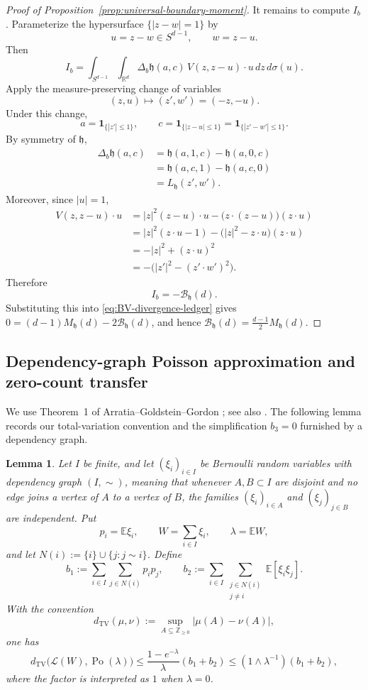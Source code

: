 \documentclass[11pt]{article}
\newtheorem{lemma}[theorem]{Lemma}
\theoremstyle{remark}
\newcommand{\ind}{\mathbf 1}
\newcommand{\E}{\mathbb E}
\numberwithin{equation}{section}
\begin{document}
\begin{proof}[Proof of Proposition~\ref{prop:universal-boundary-moment}]
It remains to compute $I_b$.  Parameterize the hypersurface
$\{|z-w|=1\}$ by
\[
u=z-w\in S^{d-1},
\qquad
w=z-u.
\]
Then
\[
I_b
=
\int_{S^{d-1}}\int_{\mathbb R^d}
\Delta_b\mathfrak h(a,c)\,
V(z,z-u)\cdot u
\,dz\,d\sigma(u).
\]
Apply the measure-preserving change of variables
\[
(z,u)\mapsto(z',w')=(-z,-u).
\]
Under this change,
\[
a=\ind_{\{|z'|\le1\}},
\qquad
c
=
\ind_{\{|z-u|\le1\}}
=
\ind_{\{|z'-w'|\le1\}}.
\]
By symmetry of $\mathfrak h$,
\[
\begin{aligned}
\Delta_b\mathfrak h(a,c)
&=
\mathfrak h(a,1,c)-\mathfrak h(a,0,c)\\
&=
\mathfrak h(a,c,1)-\mathfrak h(a,c,0)\\
&=
L_{\mathfrak h}(z',w').
\end{aligned}
\]
Moreover, since $|u|=1$,
\[
\begin{aligned}
V(z,z-u)\cdot u
&=
|z|^2(z-u)\cdot u
-
\bigl(z\cdot(z-u)\bigr)(z\cdot u)\\
&=
|z|^2(z\cdot u-1)
-
\bigl(|z|^2-z\cdot u\bigr)(z\cdot u)\\
&=
-|z|^2+(z\cdot u)^2\\
&=
-\bigl(|z'|^2-(z'\cdot w')^2\bigr).
\end{aligned}
\]
Therefore
\[I_b
=
-\mathcal B_{\mathfrak h}(d).\]
Substituting this into \eqref{eq:BV-divergence-ledger} gives
$0
=
(d-1)M_{\mathfrak h}(d)
-
2\mathcal B_{\mathfrak h}(d)$,
and hence
$\mathcal B_{\mathfrak h}(d)
=
\frac{d-1}{2}M_{\mathfrak h}(d)$.
\end{proof}


\subsection{Dependency-graph Poisson approximation and zero-count transfer}

We use Theorem~1 of Arratia--Goldstein--Gordon
\cite{ArratiaGoldsteinGordon1989}; see also
\cite{BarbourHolstJanson1992}.
The following lemma records our total-variation convention and the
simplification \(b_3=0\) furnished by a dependency graph.

\begin{lemma}
\label{lem:dep-graph}
Let \(I\) be finite, and let \((\xi_i)_{i\in I}\) be Bernoulli random
variables with dependency graph \((I,\sim)\), meaning that whenever
\(A,B\subset I\) are disjoint and no edge joins a vertex of \(A\) to a
vertex of \(B\), the families
$(\xi_i)_{i\in A}$ and $(\xi_j)_{j\in B}$
are independent.
Put
\[
p_i=\E\xi_i,
\qquad
W=\sum_{i\in I}\xi_i,
\qquad
\lambda=\E W,
\]
and let $N(i):=\{i\}\cup\{j:j\sim i\}$.
Define
\[
b_1
:=
\sum_{i\in I}\sum_{j\in N(i)}p_ip_j,
\qquad
b_2
:=
\sum_{i\in I}
\sum_{\substack{j\in N(i)\\j\ne i}}
\E[\xi_i\xi_j].
\]
With the convention
\[
d_{\mathrm{TV}}(\mu,\nu)
:=
\sup_{A\subseteq\mathbb Z_{\ge0}}
|\mu(A)-\nu(A)|,
\]
one has
\[
d_{\mathrm{TV}}
\bigl(
\mathcal L(W),
\operatorname{Po}(\lambda)
\bigr)
\le
\frac{1-e^{-\lambda}}{\lambda}(b_1+b_2)
\le
(1\wedge\lambda^{-1})(b_1+b_2),
\]
where the factor is interpreted as \(1\) when \(\lambda=0\).
\end{lemma}
\end{document}

